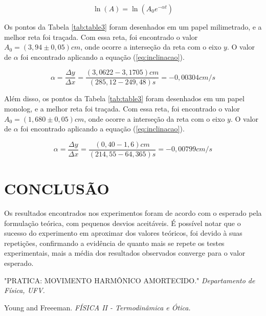 \documentclass[10pt]{article}
\begin{document}
\begin{equation}
\ln(A) = \ln({A_0e^{-\alpha t}})
\label{eq:linear}
\end{equation}

\begin{table}[ht]
	\begin{center}
		\caption{Amplitudes após a linearização, com seus respectivos tempos médios}
		\label{tab:table3}
	\end{center}
\end{table}

Os pontos da Tabela \ref{tab:table3} foram desenhados em um papel milimetrado, e a melhor reta foi traçada. Com essa reta, foi encontrado o valor $A_0 = (3,94 \pm 0,05) cm$, onde ocorre a interseção da reta com o eixo $y$. O valor de $\alpha$ foi encontrado aplicando a equação (\ref{eq:inclinacao}).

\begin{equation}
\alpha = \frac{\Delta y}{\Delta x} = \frac{(3,0622 - 3,1705) cm}{(285,12-249,48)s} = -0,00304cm/s
\label{eq:inclinacao}
\end{equation}

Além disso, os pontos da Tabela \ref{tab:table3} foram desenhados em um papel monolog, e a melhor reta foi traçada. Com essa reta, foi encontrado o valor $A_0 = (1,680 \pm 0,05) cm$, onde ocorre a interseção da reta com o eixo $y$. O valor de $\alpha$ foi encontrado aplicando a equação (\ref{eq:inclinacao}).

\begin{equation}
\alpha = \frac{\Delta y}{\Delta x} = \frac{(0,40 - 1,6) cm}{(214,55-64,365)s} = -0,00799cm/s
\label{eq:inclinacao}
\end{equation}

\section{CONCLUSÃO}

Os resultados encontrados nos experimentos foram de acordo com o esperado pela formulação teórica, com pequenos desvios aceitáveis. É possível notar que o sucesso do experimento em aproximar dos valores teóricos, foi devido à suas repetições, confirmando a evidência de quanto mais se repete os testes experimentais, mais a média dos resultados observados converge para o valor esperado.  

\begin{thebibliography}{9}
	
	"PRATICA: MOVIMENTO HARMÔNICO AMORTECIDO."
	\textit{Departamento de Física, UFV.}


Young and Freeeman.
\textit{FÍSICA II - Termodinâmica e Ótica.}	
\end{thebibliography}
\end{document}

